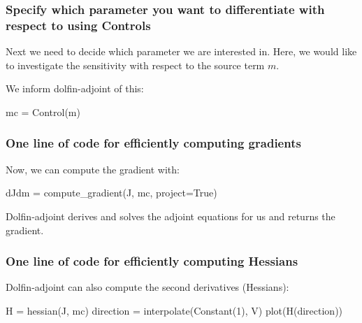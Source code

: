 \begin{frame}[fragile]
  \frametitle{Specify which parameter you want to differentiate with
    respect to using Controls}

Next we need to decide which parameter we are interested in. Here, we
would like to investigate the sensitivity with respect to the source
term $m$.

\bigskip

We inform dolfin-adjoint of this:
\vspace{-1em}
\begin{python}
mc = Control(m)
\end{python}

\end{frame}

\begin{frame}[fragile]
  \frametitle{One line of code for efficiently computing gradients}

  Now, we can compute the gradient with:
\vspace{-1em}
  \begin{python}
dJdm = compute_gradient(J, mc, project=True)
  \end{python}

  Dolfin-adjoint derives and solves the adjoint equations for us and
  returns the gradient.

\end{frame}

\begin{frame}[fragile]
  \frametitle{One line of code for efficiently computing Hessians}

  Dolfin-adjoint can also compute the second derivatives (Hessians):
\vspace{-1em}
  \begin{python}
H = hessian(J, mc)
direction = interpolate(Constant(1), V)
plot(H(direction))
  \end{python}

\end{frame}

